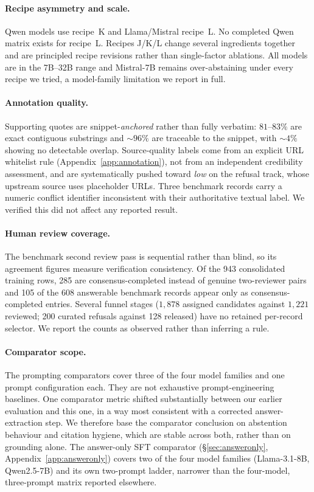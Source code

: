 \paragraph{Recipe asymmetry and scale.} Qwen models use recipe~K and
Llama/Mistral recipe~L. No completed Qwen matrix exists for recipe~L. Recipes
J/K/L change several ingredients together and are principled recipe revisions
rather than single-factor ablations. All models are in the 7B--32B range and
Mistral-7B remains over-abstaining under every recipe we tried, a model-family
limitation we report in full.

\paragraph{Annotation quality.} Supporting quotes are snippet-\emph{anchored}
rather than fully verbatim: $81$--$83\%$ are exact contiguous substrings and
${\sim}96\%$ are traceable to the snippet, with ${\sim}4\%$ showing no detectable
overlap. Source-quality labels come from an explicit URL whitelist rule
(Appendix~\ref{app:annotation}), not from an independent credibility assessment,
and are systematically pushed toward \textit{low} on the refusal track, whose
upstream source uses placeholder URLs. Three benchmark records carry a numeric
conflict identifier inconsistent with their authoritative textual label. We
verified this did not affect any reported result.

\paragraph{Human review coverage.} The benchmark second review pass is
sequential rather than blind, so its agreement figures measure verification
consistency. Of the 943 consolidated training rows, 285 are consensus-completed
instead of genuine two-reviewer pairs and 105 of the 608 answerable benchmark
records appear only as consensus-completed entries. Several funnel stages
($1{,}878$ assigned candidates against $1{,}221$ reviewed; 200 curated refusals
against 128 released) have no retained per-record selector. We report the
counts as observed rather than inferring a rule.

\paragraph{Comparator scope.} The prompting comparators cover three of the four
model families and one prompt configuration each. They are not exhaustive
prompt-engineering baselines. One comparator metric shifted substantially
between our earlier evaluation and this one, in a way most consistent with a
corrected answer-extraction step. We therefore base the comparator conclusion on
abstention behaviour and citation hygiene, which are stable across both, rather
than on grounding alone. The answer-only SFT comparator
(\S\ref{sec:answeronly}, Appendix~\ref{app:answeronly}) covers two of the four
model families (Llama-3.1-8B, Qwen2.5-7B) and its own two-prompt ladder,
narrower than the four-model, three-prompt matrix reported elsewhere.
